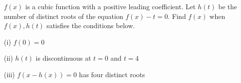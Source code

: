 $f(x)$ is a cubic function with a positive leading coefficient. Let $h(t)$ be the number of distinct roots of the equation $f(x)-t=0$. Find $f(x)$ when $f(x), h(t)$ satisfies the conditions below.

(i) $f(0)=0$

(ii) $h(t)$ is discontinuous at $t=0$ and $t=4$

(iii) $f(x-h(x))=0$ has four distinct roots

